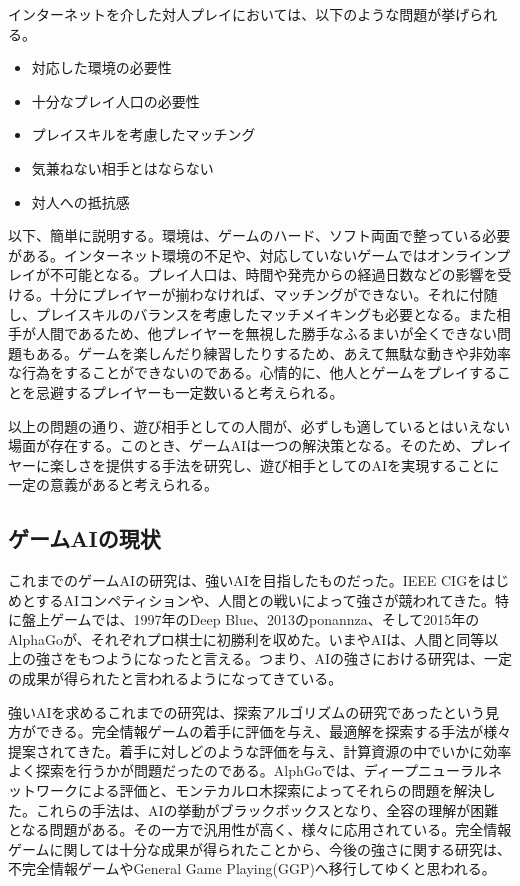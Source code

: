\documentclass[12pt]{jarticle}
\begin{document}
インターネットを介した対人プレイにおいては、以下のような問題が挙げられる。
\begin{itemize}
\item 対応した環境の必要性
\item 十分なプレイ人口の必要性
\item プレイスキルを考慮したマッチング
\item 気兼ねない相手とはならない
\item 対人への抵抗感
\end{itemize}
以下、簡単に説明する。環境は、ゲームのハード、ソフト両面で整っている必要がある。インターネット環境の不足や、対応していないゲームではオンラインプレイが不可能となる。プレイ人口は、時間や発売からの経過日数などの影響を受ける。十分にプレイヤーが揃わなければ、マッチングができない。それに付随し、プレイスキルのバランスを考慮したマッチメイキングも必要となる。また相手が人間であるため、他プレイヤーを無視した勝手なふるまいが全くできない問題もある。ゲームを楽しんだり練習したりするため、あえて無駄な動きや非効率な行為をすることができないのである。心情的に、他人とゲームをプレイすることを忌避するプレイヤーも一定数いると考えられる。

以上の問題の通り、遊び相手としての人間が、必ずしも適しているとはいえない場面が存在する。このとき、ゲームAIは一つの解決策となる。そのため、プレイヤーに楽しさを提供する手法を研究し、遊び相手としてのAIを実現することに一定の意義があると考えられる。

\subsection{ゲームAIの現状}
これまでのゲームAIの研究は、強いAIを目指したものだった。IEEE CIGをはじめとするAIコンペティション\cite{cig}や、人間との戦いによって強さが競われてきた。特に盤上ゲームでは、1997年のDeep Blue、2013のponannza、そして2015年のAlphaGo\cite{alphaGo}が、それぞれプロ棋士に初勝利を収めた。いまやAIは、人間と同等以上の強さをもつようになったと言える。つまり、AIの強さにおける研究は、一定の成果が得られたと言われるようになってきている。

強いAIを求めるこれまでの研究は、探索アルゴリズムの研究であったという見方ができる。完全情報ゲームの着手に評価を与え、最適解を探索する手法が様々提案されてきた。着手に対しどのような評価を与え、計算資源の中でいかに効率よく探索を行うかが問題だったのである。AlphGoでは、ディープニューラルネットワークによる評価と、モンテカルロ木探索によってそれらの問題を解決した。これらの手法は、AIの挙動がブラックボックスとなり、全容の理解が困難となる問題がある。その一方で汎用性が高く、様々に応用されている\cite{NE, monte}。完全情報ゲームに関しては十分な成果が得られたことから、今後の強さに関する研究は、不完全情報ゲームやGeneral Game Playing(GGP)へ移行してゆくと思われる。
\end{document}
